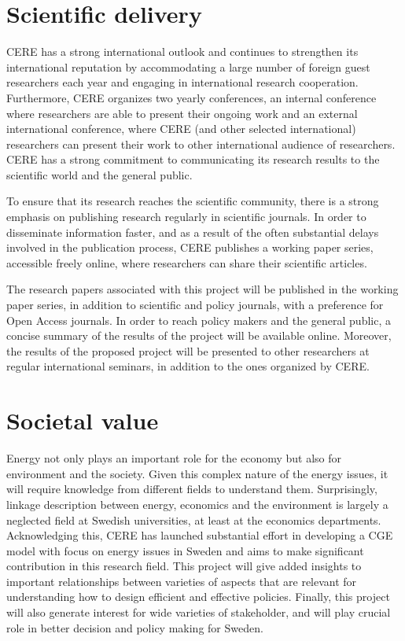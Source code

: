 \section{Scientific delivery}
CERE has a strong international outlook and continues to strengthen its international reputation by accommodating a large number of foreign guest researchers each year and engaging in international research cooperation. Furthermore, CERE organizes two yearly conferences, an internal conference where researchers are able to present their ongoing work and an external international conference, where CERE (and other selected international) researchers can present their work to other international audience of researchers. CERE has a strong commitment to communicating its research results to the scientific world and the general public.

To ensure that its research reaches the scientific community, there is a strong emphasis on publishing research regularly in scientific journals. In order to disseminate information faster, and as a result of the often substantial delays involved in the publication process, CERE publishes a working paper series, accessible freely online, where researchers can share their scientific articles.

The research papers associated with this project will be published in the working paper series, in addition to scientific and policy journals, with a preference for Open Access journals. In order to reach policy makers and the general public, a concise summary of the results of the project will be available online. Moreover, the results of the proposed project will be presented to other researchers at regular international seminars, in addition to the ones organized by CERE.

\section{Societal value}
Energy not only plays an important role for the economy but also for environment and the society. Given this complex nature of the energy issues, it will require knowledge from different fields to understand them. Surprisingly, linkage description between energy, economics and the environment is largely a neglected field at Swedish universities, at least at the economics departments. Acknowledging this, CERE has launched substantial effort in developing a CGE model with focus on energy issues in Sweden and aims to make significant contribution in this research field. This project will give added insights to important relationships between varieties of aspects that are relevant for understanding how to design efficient and effective policies. Finally, this project will also generate interest for wide varieties of stakeholder, and will play crucial role in better decision and policy making for Sweden.

